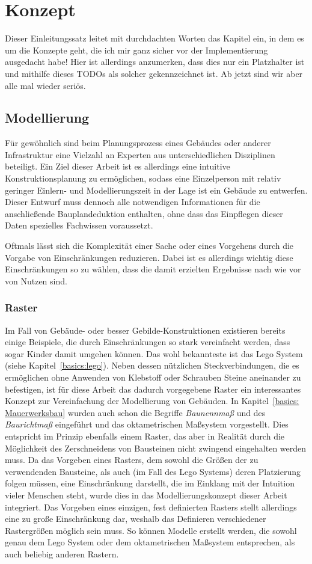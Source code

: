 \chapter{Konzept}
Dieser Einleitungssatz leitet mit durchdachten Worten das Kapitel ein, in dem es um die Konzepte geht, die ich mir ganz sicher vor der Implementierung ausgedacht habe!
Hier ist allerdings anzumerken, dass dies nur ein Platzhalter ist und mithilfe dieses TODOs als solcher gekennzeichnet ist.
Ab jetzt sind wir aber alle mal wieder seriös.

\section{Modellierung}
Für gewöhnlich sind beim Planungsprozess eines Gebäudes oder anderer Infrastruktur eine Vielzahl an Experten aus unterschiedlichen Disziplinen beteiligt.
Ein Ziel dieser Arbeit ist es allerdings eine intuitive Konstruktionsplanung zu ermöglichen, sodass eine Einzelperson mit relativ geringer Einlern- und Modellierungszeit in der Lage ist ein Gebäude zu entwerfen.
Dieser Entwurf muss dennoch alle notwendigen Informationen für die anschließende Bauplandeduktion enthalten, ohne dass das Einpflegen dieser Daten spezielles Fachwissen voraussetzt.

Oftmals lässt sich die Komplexität einer Sache oder eines Vorgehens durch die Vorgabe von Einschränkungen reduzieren.
Dabei ist es allerdings wichtig diese Einschränkungen so zu wählen, dass die damit erzielten Ergebnisse nach wie vor von Nutzen sind.

\subsection{Raster}
Im Fall von Gebäude- oder besser Gebilde-Konstruktionen existieren bereits einige Beispiele, die durch Einschränkungen so stark vereinfacht werden, dass sogar Kinder damit umgehen können.
Das wohl bekannteste ist das Lego System (siehe Kapitel~\ref{basics:lego}).
Neben dessen nützlichen Steckverbindungen, die es ermöglichen ohne Anwenden von Klebstoff oder Schrauben Steine aneinander zu befestigen, ist für diese Arbeit das dadurch vorgegebene Raster ein interessantes Konzept zur Vereinfachung der Modellierung von Gebäuden.
In Kapitel~\ref{basics: Mauerwerksbau} wurden auch schon die Begriffe \textit{Baunennmaß} und des \textit{Baurichtmaß} eingeführt und das oktametrischen Maßsystem vorgestellt.
Dies entspricht im Prinzip ebenfalls einem Raster, das aber in Realität durch die Möglichkeit des Zerschneidens von Bausteinen nicht zwingend eingehalten werden muss.
Da das Vorgeben eines Rasters, dem sowohl die Größen der zu verwendenden Bausteine, als auch (im Fall des Lego Systems) deren Platzierung folgen müssen, eine Einschränkung darstellt, die im Einklang mit der Intuition vieler Menschen steht, wurde dies in das Modellierungskonzept dieser Arbeit integriert.
Das Vorgeben eines einzigen, fest definierten Rasters stellt allerdings eine zu große Einschränkung dar, weshalb das Definieren verschiedener Rastergrößen möglich sein muss.
So können Modelle erstellt werden, die sowohl genau dem Lego System oder dem oktametrischen Maßsystem entsprechen, als auch beliebig anderen Rastern.

